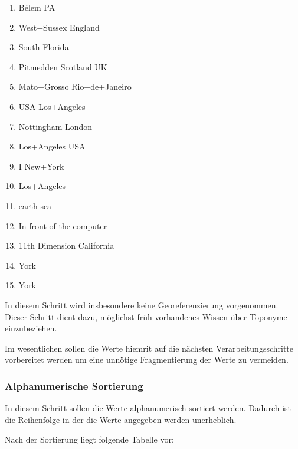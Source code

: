 				\begin{multicols}{2}
					\begin{enumerate}
						\item Bélem PA
						\item West+Sussex England
						\item South Florida
						\item Pitmedden Scotland UK
						\item Mato+Grosso Rio+de+Janeiro
						\item USA Los+Angeles
						\item Nottingham London
						\item Los+Angeles USA
						\item I New+York 
						\item Los+Angeles
						\item earth sea
						\item In front of the computer
						\item 11th Dimension California
						\item York
						\item York
					\end{enumerate}
				\end{multicols}
				In diesem Schritt wird insbesondere keine Georeferenzierung vorgenommen. 
				Dieser Schritt dient dazu, möglichst früh vorhandenes Wissen über Toponyme einzubeziehen.

				Im wesentlichen sollen die Werte hiemrit auf die nächsten Verarbeitungsschritte vorbereitet werden um eine unnötige Fragmentierung der Werte zu vermeiden.

			\subsubsection{Alphanumerische Sortierung}

				In diesem Schritt sollen die Werte alphanumerisch sortiert werden. 
				Dadurch ist die Reihenfolge in der die Werte angegeben werden unerheblich.

				Nach der Sortierung liegt folgende Tabelle vor:

